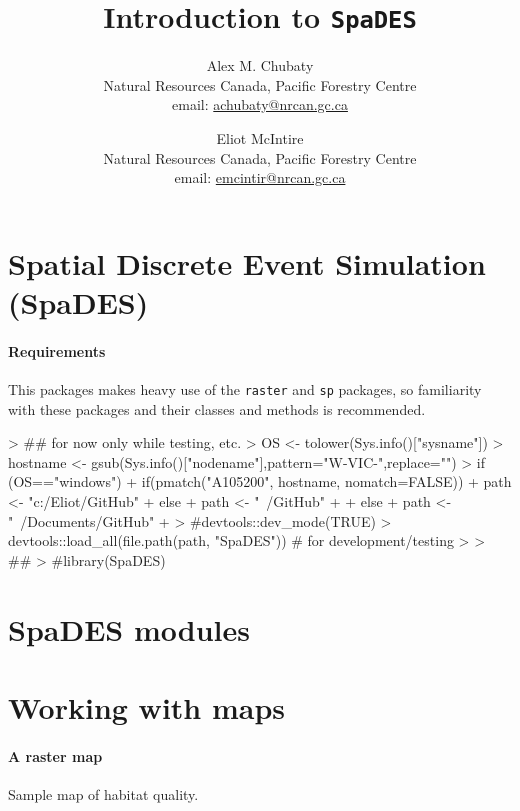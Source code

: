 \documentclass{article}
\title{Introduction to \texttt{SpaDES}}
\author{
  Alex M. Chubaty\\
	\small{Natural Resources Canada, Pacific Forestry Centre}\\
	\small{email: \href{mailto:achubaty@nrcan.gc.ca}{achubaty@nrcan.gc.ca}}
	\and
	Eliot McIntire\\
	\small{Natural Resources Canada, Pacific Forestry Centre}\\
	\small{email: \href{mailto:emcintir@nrcan.gc.ca}{emcintir@nrcan.gc.ca}}
}
\begin{document}


\maketitle

\tableofcontents

\newpage

\section{Spatial Discrete Event Simulation (SpaDES)}

\paragraph{Requirements}
This packages makes heavy use of the \texttt{raster} and \texttt{sp} packages, so familiarity with these packages and their classes and methods is recommended.

\begin{Schunk}
\begin{Sinput}
> ## for now only while testing, etc.
> OS <- tolower(Sys.info()["sysname"])
> hostname <- gsub(Sys.info()["nodename"],pattern="W-VIC-",replace="")
> if (OS=="windows") {
+     if(pmatch("A105200", hostname, nomatch=FALSE)) {
+         path <- "c:/Eliot/GitHub"
+     } else {
+         path <- "~/GitHub"
+     }
+ } else {
+     path <- "~/Documents/GitHub"
+ }
> #devtools::dev_mode(TRUE)
> devtools::load_all(file.path(path, "SpaDES")) # for development/testing
> 
> ## 
> #library(SpaDES)
\end{Sinput}
\end{Schunk}


\newpage

\section{SpaDES modules}

\lipsum

\newpage

\section{Working with maps}

\paragraph{A raster map}
Sample map of habitat quality.
\end{document}
